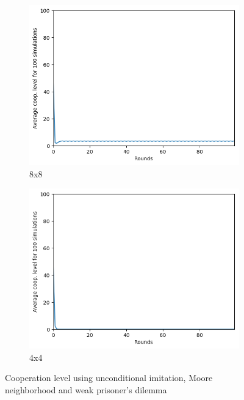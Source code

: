 \documentclass[letterpaper]{article}
\begin{document}
\begin{figure}[H]
\begin{subfigure}{.5\textwidth}
        \centering
        \includegraphics[width=1\linewidth]{images/assign2/8-part1}
        \caption{8x8}
        \label{fig:8moorepart1}
    \end{subfigure}
    \begin{subfigure}{.5\textwidth}
        \centering
        \includegraphics[width=1\linewidth]{images/assign2/4-part1}
        \caption{4x4}
        \label{fig:4moorepart1}
    \end{subfigure}
    \caption{Cooperation level using unconditional imitation, Moore neighborhood
    and weak prisoner's dilemma}
    \label{fig:otherpart1}
\end{figure}
\end{document}
